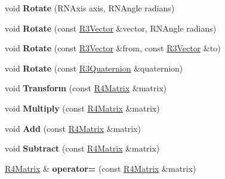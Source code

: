 \begin{DoxyCompactItemize}
\item 
void {\bfseries Rotate} (R\+N\+Axis axis, R\+N\+Angle radians)\hypertarget{class_r4_matrix_adae696f4180b663b70448d1ab72efd78}{}\label{class_r4_matrix_adae696f4180b663b70448d1ab72efd78}

\item 
void {\bfseries Rotate} (const \hyperlink{class_r3_vector}{R3\+Vector} \&vector, R\+N\+Angle radians)\hypertarget{class_r4_matrix_ad9ef6b4a0fddf02ed32376e6a26a1ee8}{}\label{class_r4_matrix_ad9ef6b4a0fddf02ed32376e6a26a1ee8}

\item 
void {\bfseries Rotate} (const \hyperlink{class_r3_vector}{R3\+Vector} \&from, const \hyperlink{class_r3_vector}{R3\+Vector} \&to)\hypertarget{class_r4_matrix_a86c7b71f816a0f5bbedd664acca73748}{}\label{class_r4_matrix_a86c7b71f816a0f5bbedd664acca73748}

\item 
void {\bfseries Rotate} (const \hyperlink{class_r3_quaternion}{R3\+Quaternion} \&quaternion)\hypertarget{class_r4_matrix_ae73295a559b23901d5fa0c67e0555571}{}\label{class_r4_matrix_ae73295a559b23901d5fa0c67e0555571}

\item 
void {\bfseries Transform} (const \hyperlink{class_r4_matrix}{R4\+Matrix} \&matrix)\hypertarget{class_r4_matrix_af61e5260a44079f0c6c945a5a9b149e8}{}\label{class_r4_matrix_af61e5260a44079f0c6c945a5a9b149e8}

\item 
void {\bfseries Multiply} (const \hyperlink{class_r4_matrix}{R4\+Matrix} \&matrix)\hypertarget{class_r4_matrix_a025e0b8d797c0c390029a563a7cf5077}{}\label{class_r4_matrix_a025e0b8d797c0c390029a563a7cf5077}

\item 
void {\bfseries Add} (const \hyperlink{class_r4_matrix}{R4\+Matrix} \&matrix)\hypertarget{class_r4_matrix_aa144c9337297a23398df4b2ee0b48e9e}{}\label{class_r4_matrix_aa144c9337297a23398df4b2ee0b48e9e}

\item 
void {\bfseries Subtract} (const \hyperlink{class_r4_matrix}{R4\+Matrix} \&matrix)\hypertarget{class_r4_matrix_ab124f7fcb87f4ee6a2f65e878111f026}{}\label{class_r4_matrix_ab124f7fcb87f4ee6a2f65e878111f026}

\item 
\hyperlink{class_r4_matrix}{R4\+Matrix} \& {\bfseries operator=} (const \hyperlink{class_r4_matrix}{R4\+Matrix} \&matrix)\hypertarget{class_r4_matrix_a3f8d0701e894625a5a319e5b127b6bf2}{}\label{class_r4_matrix_a3f8d0701e894625a5a319e5b127b6bf2}


\end{DoxyCompactItemize}
